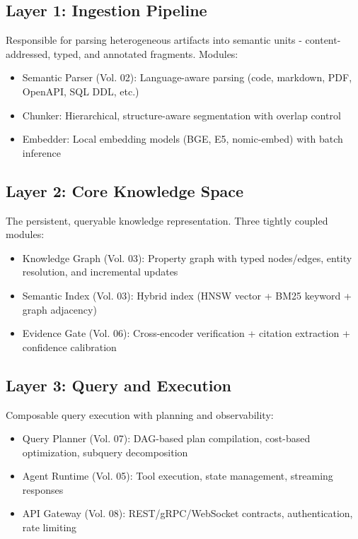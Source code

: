 \subsection{Layer 1: Ingestion Pipeline}
\label{sec:arch:ingestion}
Responsible for parsing heterogeneous artifacts into semantic units - content-addressed, typed, and annotated fragments. Modules:
\begin{itemize}
  \item Semantic Parser (Vol. 02): Language-aware parsing (code, markdown, PDF, OpenAPI, SQL DDL, etc.)
  \item Chunker: Hierarchical, structure-aware segmentation with overlap control
  \item Embedder: Local embedding models (BGE, E5, nomic-embed) with batch inference
\end{itemize}

\subsection{Layer 2: Core Knowledge Space}
\label{sec:arch:core}
The persistent, queryable knowledge representation. Three tightly coupled modules:
\begin{itemize}
  \item Knowledge Graph (Vol. 03): Property graph with typed nodes/edges, entity resolution, and incremental updates
  \item Semantic Index (Vol. 03): Hybrid index (HNSW vector + BM25 keyword + graph adjacency)
  \item Evidence Gate (Vol. 06): Cross-encoder verification + citation extraction + confidence calibration
\end{itemize}

\subsection{Layer 3: Query and Execution}
\label{sec:arch:query}
Composable query execution with planning and observability:
\begin{itemize}
  \item Query Planner (Vol. 07): DAG-based plan compilation, cost-based optimization, subquery decomposition
  \item Agent Runtime (Vol. 05): Tool execution, state management, streaming responses
  \item API Gateway (Vol. 08): REST/gRPC/WebSocket contracts, authentication, rate limiting
\end{itemize}

